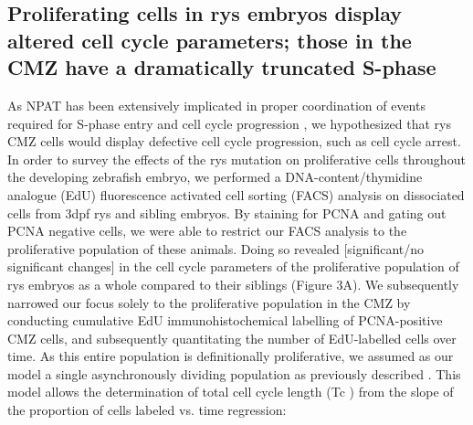 \subsection{Proliferating cells in rys embryos display altered cell cycle parameters; those in the CMZ have a dramatically truncated S-phase}
As NPAT has been extensively implicated in proper coordination of events required for S-phase entry and cell cycle progression \cite{Gao2003,Ye2003}, we hypothesized that rys CMZ cells would display defective cell cycle progression, such as cell cycle arrest. In order to survey the effects of the rys mutation on proliferative cells throughout the developing zebrafish embryo, we performed a DNA-content/thymidine analogue (EdU) fluorescence activated cell sorting (FACS) analysis on dissociated cells from 3dpf rys and sibling embryos. By staining for PCNA and gating out PCNA negative cells, we were able to restrict our FACS analysis to the proliferative population of these animals. Doing so revealed [significant/no significant changes] in the cell cycle parameters of the proliferative population of rys embryos as a whole compared to their siblings (Figure 3A). We subsequently narrowed our focus solely to the proliferative population in the CMZ by conducting cumulative EdU immunohistochemical labelling of PCNA-positive CMZ cells, and subsequently quantitating the number of EdU-labelled cells over time. As this entire population is definitionally proliferative, we assumed as our model a single asynchronously dividing population as previously described \cite{Nowakowski1989}. This model allows the determination of total cell cycle length (Tc ) from the slope of the proportion of cells labeled vs. time regression:
